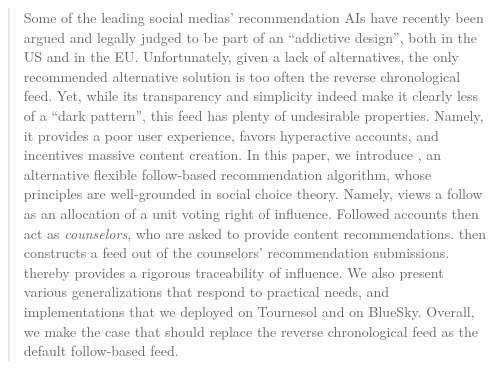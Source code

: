 \begin{abstract}
    Some of the leading social medias' recommendation AIs 
    have recently been argued and legally judged
    to be part of an ``addictive design'',
    both in the US and in the EU.
    Unfortunately, given a lack of alternatives, 
    the only recommended alternative solution is too often the reverse chronological feed.
    Yet, while its transparency and simplicity indeed make it clearly less of a ``dark pattern'',
    this feed has plenty of undesirable properties.
    Namely, it provides a poor user experience, 
    favors hyperactive accounts, and incentives massive content creation.
    In this paper, we introduce \Veche{},
    an alternative flexible follow-based recommendation algorithm,
    whose principles are well-grounded in social choice theory.
    Namely, \Veche{} views a follow as an allocation of a unit voting right of influence.
    Followed accounts then act as \emph{counselors},
    who are asked to provide content recommendations.
    \Veche{} then constructs a feed out of the counselors' recommendation submissions.
    \Veche{} thereby provides a rigorous traceability of influence.
    We also present various generalizations that respond to practical needs,
    and implementations that we deployed on Tournesol and on BlueSky.
    Overall, we make the case that \Veche{} should replace the reverse chronological feed
    as the default follow-based feed.
\end{abstract}

